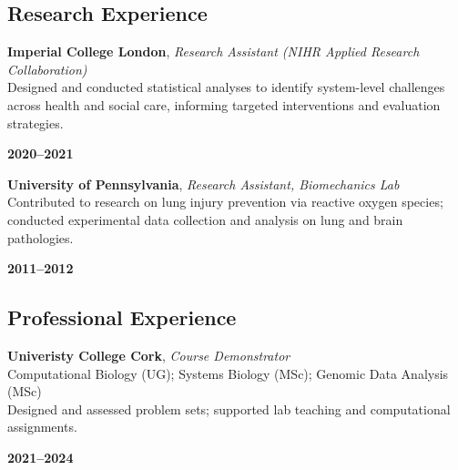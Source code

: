 \documentclass[
]{article}
\begin{document}
\subsection{Research Experience}\label{research-experience}

\noindent
\begin{minipage}[t]{0.85\textwidth}
\textbf{Imperial College London}, \emph{Research Assistant (NIHR Applied Research Collaboration)}\\
Designed and conducted statistical analyses to identify system-level challenges across health and social care, informing targeted interventions and evaluation strategies.
\end{minipage}%
\hfill
\begin{minipage}[t]{0.15\textwidth}
\raggedleft \textbf{2020--2021}
\end{minipage}

\vspace{0.6em}

\noindent
\begin{minipage}[t]{0.85\textwidth}
\textbf{University of Pennsylvania}, \emph{Research Assistant, Biomechanics Lab}\\
Contributed to research on lung injury prevention via reactive oxygen species; conducted experimental data collection and analysis on lung and brain pathologies.
\end{minipage}%
\hfill
\begin{minipage}[t]{0.15\textwidth}
\raggedleft \textbf{2011--2012}
\end{minipage}

\subsection{Professional Experience}\label{professional-experience}

\noindent
\begin{minipage}[t]{0.85\textwidth}
\textbf{Univeristy College Cork}, \emph{Course Demonstrator}\\
Computational Biology (UG); Systems Biology (MSc); Genomic Data Analysis (MSc)\\
Designed and assessed problem sets; supported lab teaching and computational assignments.
\end{minipage}%
\hfill
\begin{minipage}[t]{0.15\textwidth}
\raggedleft \textbf{2021--2024}
\end{minipage}

\vspace{0.6em}
\end{document}
